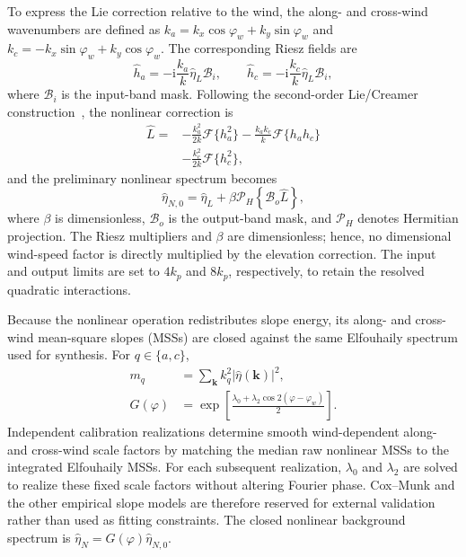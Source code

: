 To express the Lie correction relative to the wind, the along- and cross-wind wavenumbers are defined as $k_a=k_x\cos\varphi_w+k_y\sin\varphi_w$ and $k_c=-k_x\sin\varphi_w+k_y\cos\varphi_w$. The corresponding Riesz fields are
\begin{equation}
\widehat{h}_a=-\mathrm{i}\frac{k_a}{k}\widehat{\eta}_L\mathcal{B}_i,
\qquad
\widehat{h}_c=-\mathrm{i}\frac{k_c}{k}\widehat{\eta}_L\mathcal{B}_i,
\label{eq:riesz_fields}
\end{equation}
where $\mathcal{B}_i$ is the input-band mask. Following the second-order Lie/Creamer construction~\cite{zhang2023secondorder}, the nonlinear correction is
\begin{align}
\widehat{L}={}&-\frac{k_a^2}{2k}\mathcal{F}\{h_a^2\}
-\frac{k_ak_c}{k}\mathcal{F}\{h_ah_c\}
\nonumber\\
&-\frac{k_c^2}{2k}\mathcal{F}\{h_c^2\},
\label{eq:second_order_lie}
\end{align}
and the preliminary nonlinear spectrum becomes
\begin{equation}
\widehat{\eta}_{N,0}=\widehat{\eta}_L+\beta\mathcal{P}_H\!\left\{\mathcal{B}_o\widehat{L}\right\},
\label{eq:preliminary_nonlinear_spectrum}
\end{equation}
where $\beta$ is dimensionless, $\mathcal{B}_o$ is the output-band mask, and $\mathcal{P}_H$ denotes Hermitian projection. The Riesz multipliers and $\beta$ are dimensionless; hence, no dimensional wind-speed factor is directly multiplied by the elevation correction. The input and output limits are set to $4k_p$ and $8k_p$, respectively, to retain the resolved quadratic interactions.

Because the nonlinear operation redistributes slope energy, its along- and cross-wind mean-square slopes (MSSs) are closed against the same Elfouhaily spectrum used for synthesis. For $q\in\{a,c\}$,
\begin{align}
m_q&=\sum_{\boldsymbol{k}}k_q^2\left|\widehat{\eta}(\boldsymbol{k})\right|^2,
\nonumber\\
G(\varphi)&=\exp\!\left[\frac{\lambda_0+\lambda_2\cos2(\varphi-\varphi_w)}{2}\right].
\label{eq:mss_closure}
\end{align}
Independent calibration realizations determine smooth wind-dependent along- and cross-wind scale factors by matching the median raw nonlinear MSSs to the integrated Elfouhaily MSSs. For each subsequent realization, $\lambda_0$ and $\lambda_2$ are solved to realize these fixed scale factors without altering Fourier phase. Cox--Munk and the other empirical slope models are therefore reserved for external validation rather than used as fitting constraints. The closed nonlinear background spectrum is $\widehat{\eta}_N=G(\varphi)\widehat{\eta}_{N,0}$.

